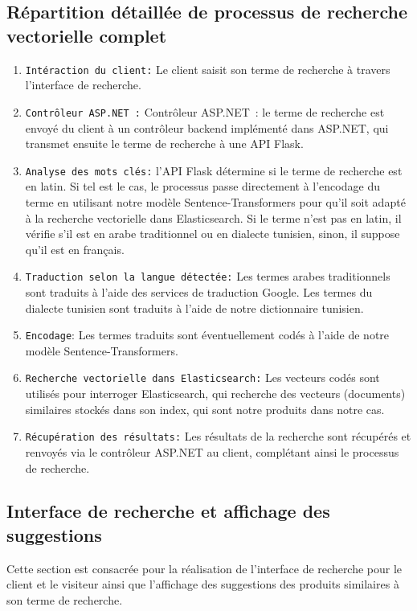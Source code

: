 \subsection{Répartition détaillée de processus de recherche vectorielle complet}
\begin{enumerate}
	\item \texttt{Intéraction du client:} Le client saisit son terme de recherche à travers l'interface de recherche.
	\item \texttt{Contrôleur ASP.NET :} Contrôleur ASP.NET : le terme de recherche est envoyé du client à un contrôleur backend implémenté dans ASP.NET, qui transmet ensuite le terme de recherche à une API Flask.
	\item \texttt{Analyse des mots clés:} l'API Flask détermine si le terme de recherche est en latin. Si tel est le cas, le processus passe directement à l'encodage du terme en utilisant notre modèle Sentence-Transformers pour qu'il soit adapté à la recherche vectorielle dans Elasticsearch. Si le terme n'est pas en latin, il vérifie s'il est en arabe traditionnel ou en dialecte tunisien, sinon, il suppose qu'il est en français.
	\item \texttt{Traduction selon la langue détectée:} Les termes arabes traditionnels sont traduits à l'aide des services de traduction Google. Les termes du dialecte tunisien sont traduits à l'aide de notre dictionnaire tunisien.
	\item \texttt{Encodage}: Les termes traduits sont éventuellement codés à l'aide de notre modèle Sentence-Transformers.
	\item \texttt{Recherche vectorielle dans Elasticsearch:} Les vecteurs codés sont utilisés pour interroger Elasticsearch, qui recherche des vecteurs (documents) similaires stockés dans son index, qui sont notre produits dans notre cas.
	\item \texttt{Récupération des résultats:} Les résultats de la recherche sont récupérés et renvoyés via le contrôleur ASP.NET au client, complétant ainsi le processus de recherche.
\end{enumerate}


\subsection{Interface de recherche et affichage des suggestions}
\noindent
Cette section est consacrée pour la réalisation de l'interface de recherche pour le client et le visiteur ainsi que l'affichage des suggestions des produits similaires à son terme de recherche. \\

